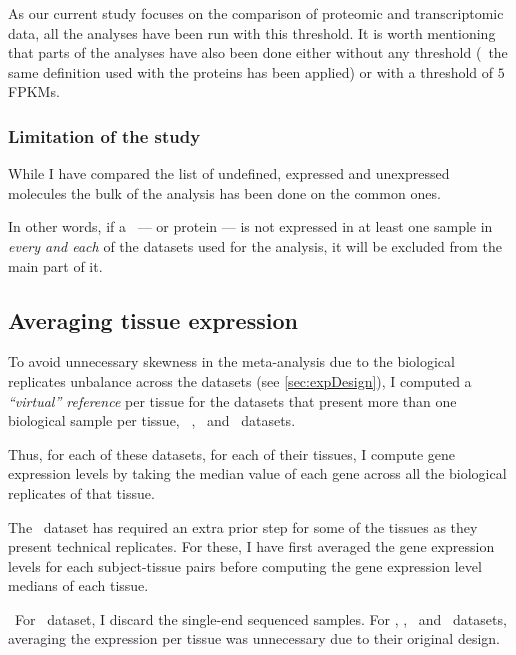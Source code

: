 As our current study focuses on the comparison of proteomic and transcriptomic
data, all the analyses have been run with this threshold. It is worth mentioning
that parts of the analyses have also been done either without
any threshold (\ie\ the same definition used with the proteins has been applied)
or with a threshold of $5$ \glspl{FPKM}.

\subsubsection{Limitation of the study}
While I have compared the list of undefined, expressed and unexpressed molecules
the bulk of the analysis has been done on the common ones.

In other words, if a \mRNA\ --- or protein --- is not expressed in at least
one sample in \emph{every and each} of the datasets used for the analysis,
it will be excluded from the main part of it.

\subsection{Averaging tissue expression}
To avoid unnecessary skewness in the meta-analysis due to
the biological replicates unbalance across the datasets
(see \cref{sec:expDesign}), I computed a \emph{\enquote{virtual} reference} per
tissue for the datasets that present more than one biological sample per tissue,
\ie\ \vt, \uhlen\ and \gtex\ datasets.

Thus, for each of these datasets, for each of their tissues, I compute gene
expression levels by taking the median value of each gene across all the
biological replicates of that tissue.

The \uhlen\ dataset has required an extra prior step for some of the tissues
as they present technical replicates.
For these, I have first averaged the gene expression levels
for each subject-tissue pairs before computing the gene expression level medians
of each tissue.

\NB\ For \ibm\ dataset, I discard the single-end sequenced samples.
For \castle, \cutler, \kuster\ and \pandey\ datasets, averaging the expression
per tissue was unnecessary due to their original design.


